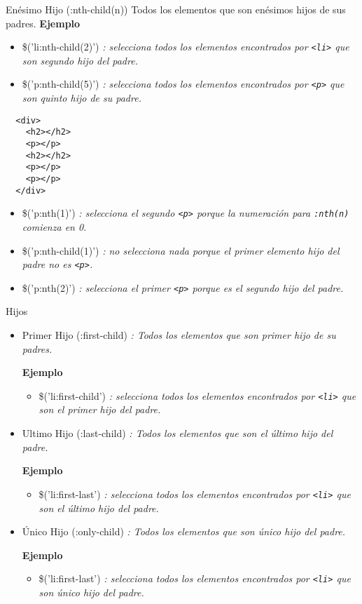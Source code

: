 \begin{frame}[fragile]{Enésimo Hijo (:nth-child(n))} %
Todos los elementos que son enésimos hijos de sus padres.
\textbf{Ejemplo}
\begin{itemize}
    \item \$('li:nth-child(2)') \textit{: selecciona todos los elementos
    encontrados por \texttt{<li>} que son segundo hijo del padre.}
    \item \$('p:nth-child(5)') \textit{: selecciona todos los elementos
    encontrados por \texttt{<p>} que son quinto hijo de su padre.}
\end{itemize}
\begin{lstlisting}
  <div>
    <h2></h2>
    <p></p>
    <h2></h2>
    <p></p>
    <p></p>
  </div>
\end{lstlisting}
\begin{itemize}
    \item \$('p:nth(1)') \textit{: selecciona el segundo \texttt{<p>} porque la
    numeración para \texttt{:nth(n)} comienza en 0.} 
    \item \$('p:nth-child(1)') \textit{: no selecciona nada porque el primer
    elemento hijo del padre no es \texttt{<p>}.}
    \item \$('p:nth(2)') \textit{: selecciona el primer \texttt{<p>} porque es
    el segundo hijo del padre.}
\end{itemize}
\end{frame}

\begin{frame}[fragile]{Hijos} %
\begin{itemize}
    \item Primer Hijo (:first-child) \textit{: Todos los elementos que son
    primer hijo de su padres.}

\textbf{Ejemplo}
\begin{itemize}
    \item \$('li:first-child') \textit{: selecciona todos los elementos
    encontrados por \texttt{<li>} que son el primer hijo del padre.} 
\end{itemize}
    \item Ultimo Hijo (:last-child) \textit{: Todos los elementos que son el último hijo del padre.}

\textbf{Ejemplo}
\begin{itemize}
    \item \$('li:first-last') \textit{: selecciona todos los elementos
    encontrados por \texttt{<li>} que son el último hijo del padre.} 
\end{itemize}
    \item Único Hijo (:only-child) \textit{: Todos los elementos que son único
    hijo del padre.}

\textbf{Ejemplo}
\begin{itemize}
    \item \$('li:first-last') \textit{: selecciona todos los elementos
    encontrados por \texttt{<li>} que son único hijo del padre.} 
\end{itemize}
\end{itemize}
\end{frame}

